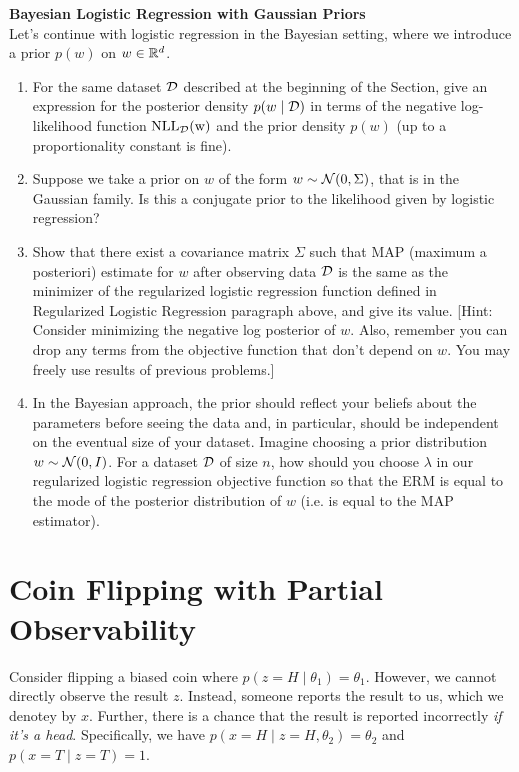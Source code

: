 \documentclass{article}
\newcommand{\nyuparagraph}[1]{\vspace{0.3cm}\textcolor{nyupurple}{\bf \large #1}\\}
\newcommand{\nll}{\rm NLL}
\theoremstyle{plain}
\theoremstyle{definition}
\begin{document}
\nyuparagraph{Bayesian Logistic Regression with Gaussian Priors}

Let's continue with logistic regression in the Bayesian setting, where we introduce a prior $p(w)$ on  $w\in\mathbb{R}^{d}$. 
\begin{enumerate}
  \setcounter{enumi}{\value{saveenum}}
\item For the same dataset $\mathcal{D}$ described at the beginning of the Section,
give an expression for the posterior density $p(w\mid\mathcal{D})$ in terms
of the negative log-likelihood function $\nll_{\cd}(w)$ and the prior density $p(w)$
(up to a proportionality constant is fine). \\

\item Suppose we take a prior on $w$ of the form $w\sim\mathcal{N}(0,\Sigma)$, that is in the Gaussian family. Is this a conjugate prior to the likelihood given by logistic regression?\\


\item Show that there exist a covariance matrix $\Sigma$ such that MAP (maximum a posteriori) estimate for $w$
after observing data $\mathcal{D}$ is the same as the minimizer of the regularized
logistic regression function defined in Regularized Logistic Regression paragraph above, and give its value. {[}Hint: Consider minimizing the negative log posterior
of $w$. Also, remember you can drop any terms from the objective
function that don't depend on $w$. You may freely use results
of previous problems.{]} \\


\item In the Bayesian approach, the prior should reflect your beliefs about
the parameters before seeing the data and, in particular, should be
independent on the eventual size of your dataset. Imagine choosing a prior distribution $w\sim\mathcal{N}(0,I)$. For a dataset $\mathcal{D}$
of size $n$, how should you choose $\lambda$ in our regularized
logistic regression objective function so that the ERM is equal
to the mode of the posterior distribution of $w$ (i.e. is equal to
the MAP estimator). 
\setcounter{saveenum}{\value{enumi}}
\end{enumerate}

\section{Coin Flipping with Partial Observability}
Consider flipping a biased coin where $p(z=H\mid \theta_1) = \theta_1$.
However, we cannot directly observe the result $z$.
Instead, someone reports the result to us,
which we denotey by $x$.
Further, there is a chance that the result is reported incorrectly \emph{if it's a head}.
Specifically, we have $p(x=H\mid z=H, \theta_2) = \theta_2$
and $p(x=T\mid z=T) = 1$.
\end{document}
